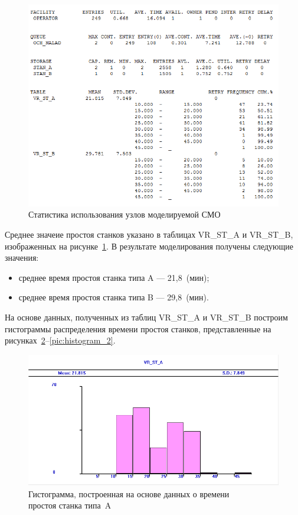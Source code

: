 \newpage

\begin{figure}[h!]
  \centering
  \includegraphics[width=0.8\linewidth]{pic/report_3}
  \caption{Статистика использования узлов моделируемой СМО}
  \label{pic:report_3}
\end{figure}

Среднее значеие простоя станков указано в таблицах VR\_ST\_A и VR\_ST\_B,
изображенных на рисунке~\ref{pic:report_3}. В результате моделирования получены
следующие значения:

\begin{itemize}
  \item среднее время простоя станка типа A --- 21{,}8~(мин);
  \item среднее время простоя станка типа B --- 29{,}8~(мин).
\end{itemize}

\newpage

На основе данных, полученных из таблиц VR\_ST\_A и VR\_ST\_B построим
гистограммы распределения времени простоя станков, представленные
на рисунках~\ref{pic:histogram_1}--\ref{pic:histogram_2}.

\begin{figure}[h!]
  \centering
  \includegraphics[width=0.8\linewidth]{pic/histogram_1}
  \caption{Гистограмма, построенная на основе данных о времени \\
    простоя станка типа~A}
  \label{pic:histogram_1}
\end{figure}


